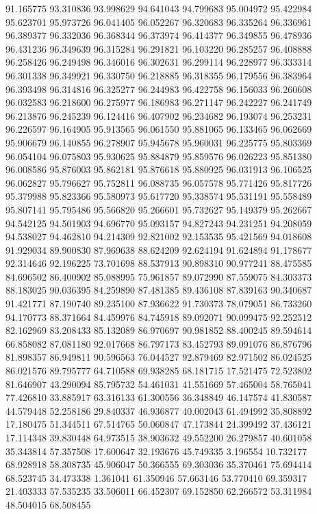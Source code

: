91.165775
93.310836
93.998629
94.641043
94.799683
95.004972
95.422984
95.623701
95.973726
96.041405
96.052267
96.320683
96.335264
96.336961
96.389377
96.332036
96.368344
96.373974
96.414377
96.349855
96.478936
96.431236
96.349639
96.315284
96.291821
96.103220
96.285257
96.408888
96.258426
96.249498
96.346016
96.302631
96.299114
96.228977
96.333314
96.301338
96.349921
96.330750
96.218885
96.318355
96.179556
96.383964
96.393498
96.314816
96.325277
96.244983
96.422758
96.156033
96.260608
96.032583
96.218600
96.275977
96.186983
96.271147
96.242227
96.241749
96.213876
96.245239
96.124416
96.407902
96.234682
96.193074
96.253231
96.226597
96.164905
95.913565
96.061550
95.881065
96.133465
96.062669
95.906679
96.140855
96.278907
95.945678
95.960031
96.225775
95.803369
96.054104
96.075803
95.930625
95.884879
95.859576
96.026223
95.851380
96.008586
95.876003
95.862181
95.876618
95.880925
96.031913
96.106525
96.062827
95.796627
95.752811
96.088735
96.057578
95.771426
95.817726
95.379988
95.823366
95.580973
95.617720
95.338574
95.531191
95.558489
95.807141
95.795486
95.566820
95.266601
95.732627
95.149379
95.262667
94.542125
94.501903
94.696770
95.093157
94.827243
94.231251
94.208059
94.538027
94.462810
94.214309
92.821002
92.153535
95.421569
94.018608
91.929034
89.900830
87.969638
88.624209
92.624194
91.624894
91.178677
92.314646
92.196225
73.701698
88.537913
90.898310
90.977241
88.475585
84.696502
86.400902
85.088995
75.961857
89.072990
87.559075
84.303373
88.183025
90.036395
84.259890
87.481385
89.436108
87.839163
90.340687
91.421771
87.190740
89.235100
87.936622
91.730373
78.079051
86.733260
94.170773
88.371664
84.459976
84.745918
89.092071
90.099475
92.252512
82.162969
83.208433
85.132089
86.970697
90.981852
88.400245
89.594614
66.858082
87.081180
92.017668
86.797173
83.452793
89.091076
86.876796
81.898357
86.949811
90.596563
76.044527
92.879469
82.971502
86.024525
86.021576
89.795777
64.710588
69.938285
68.181715
17.521475
72.523802
81.646907
43.290094
85.795732
54.461031
41.551669
57.465004
58.765041
77.426810
33.885917
63.316133
61.300556
36.348849
46.147574
41.830587
44.579448
52.258186
29.840337
46.936877
40.002043
61.494992
35.808892
17.180475
51.344511
67.514765
50.060847
47.173844
24.399492
37.436121
17.114348
39.830448
64.973515
38.903632
49.552200
26.279857
40.601058
35.343814
57.357508
17.600647
32.193676
45.749335
3.196554
10.732177
68.928918
58.308735
45.906047
50.366555
69.303036
35.370461
75.694414
68.523745
34.473338
1.361041
61.350946
57.663146
53.770410
69.359317
21.403333
57.535235
33.506011
66.452307
69.152850
62.266572
53.311984
48.504015
68.508455
